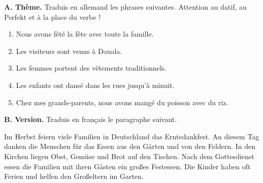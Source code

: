 \documentclass[11pt]{article}
\begin{document}
\begin{exercice}
\textbf{A. Thème.} Traduis en allemand les phrases suivantes. Attention au datif, au Perfekt et à la place du verbe !
\begin{enumerate}
\item Nous avons fêté la fête avec toute la famille.
\item Les visiteurs sont venus à Douala.
\item Les femmes portent des vêtements traditionnels.
\item Les enfants ont dansé dans les rues jusqu'à minuit.
\item Chez mes grands-parents, nous avons mangé du poisson avec du riz.
\end{enumerate}

\textbf{B. Version.} Traduis en français le paragraphe suivant.

\begin{textebox}
Im Herbst feiern viele Familien in Deutschland das Erntedankfest. An diesem Tag danken die Menschen für das Essen aus den Gärten und von den Feldern. In den Kirchen liegen Obst, Gemüse und Brot auf den Tischen. Nach dem Gottesdienst essen die Familien mit ihren Gästen ein großes Festessen. Die Kinder haben oft Ferien und helfen den Großeltern im Garten.
\end{textebox}
\end{exercice}
\end{document}
